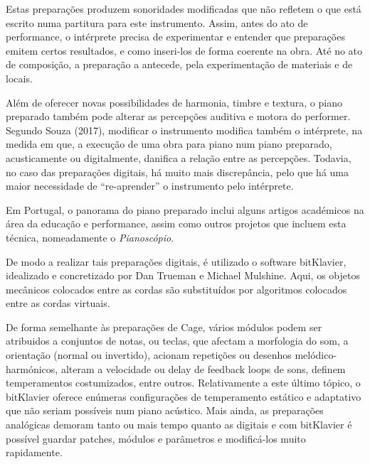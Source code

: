 \documentclass[../main.tex]{subfiles}
\begin{document}
Estas preparações produzem sonoridades modificadas que não refletem o que está escrito numa partitura para este instrumento.
Assim, antes do ato de performance, o intérprete precisa de experimentar e entender que preparações emitem certos resultados, e como inseri-los de forma coerente na obra.
Até no ato de composição, a preparação a antecede, pela experimentação de materiais e de locais\cite{cage1958}.

Além de oferecer novas possibilidades de harmonia, timbre e textura, o piano preparado também pode alterar as percepções auditiva e motora do performer.
Segundo Souza (2017), modificar o instrumento modifica também o intérprete, na medida em que, a execução de uma obra para piano num piano preparado, acusticamente ou digitalmente, danifica a relação entre as percepções.
Todavia, no caso das preparações digitais, há muito mais discrepância, pelo que há uma maior necessidade de \enquote{re-aprender} o instrumento pelo intérprete\cite{souza2017}.

Em Portugal, o panorama do piano preparado inclui alguns artigos académicos na área da educação\cite{tsanko2020} e performance\cite{miguel2021}, assim como outros projetos que incluem esta técnica, nomeadamente o \textit{Pianoscópio}\cite{vaz2016,cmt2021}. 

De modo a realizar tais preparações digitais, é utilizado o software bitKlavier, idealizado e concretizado por Dan Trueman e Michael Mulshine\cite{trueman2019}.
Aqui, os objetos mecânicos colocados entre as cordas são substituídos por algoritmos colocados entre as cordas virtuais.

De forma semelhante às preparações de Cage, vários módulos podem ser atribuidos a conjuntos de notas, ou teclas, que afectam a morfologia do som, a orientação (normal ou invertido), acionam repetições ou desenhos melódico-harmónicos, alteram a velocidade ou delay de feedback loops de sons, definem temperamentos costumizados, entre outros.
Relativamente a este último tópico, o bitKlavier oferece enúmeras configurações de temperamento estático e adaptativo que não seriam possíveis num piano acústico\cite{trueman2019b}.
Mais ainda, as preparações analógicas demoram tanto ou mais tempo quanto as digitais e com bitKlavier é possível guardar patches, módulos e parâmetros e modificá-los muito rapidamente\cite{trueman2019}.
\end{document}
